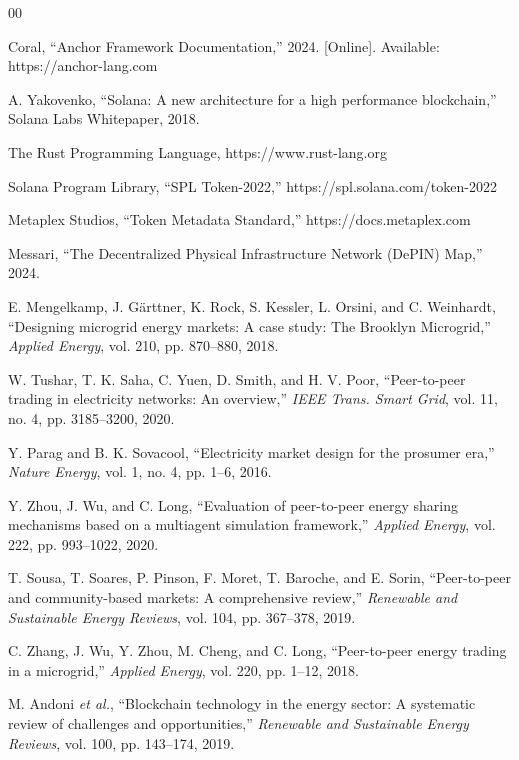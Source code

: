 \documentclass[conference]{IEEEtran}
\begin{document}
\begin{thebibliography}{00}

 Coral, ``Anchor Framework Documentation,'' 2024. [Online]. Available: https://anchor-lang.com

 A. Yakovenko, ``Solana: A new architecture for a high performance blockchain,'' Solana Labs Whitepaper, 2018.

 The Rust Programming Language, https://www.rust-lang.org

 Solana Program Library, ``SPL Token-2022,'' https://spl.solana.com/token-2022

 Metaplex Studios, ``Token Metadata Standard,'' https://docs.metaplex.com

 Messari, ``The Decentralized Physical Infrastructure Network (DePIN) Map,'' 2024.

 E. Mengelkamp, J. G\"arttner, K. Rock, S. Kessler, L. Orsini, and C. Weinhardt, ``Designing microgrid energy markets: A case study: The Brooklyn Microgrid,'' \textit{Applied Energy}, vol. 210, pp. 870--880, 2018.

 W. Tushar, T. K. Saha, C. Yuen, D. Smith, and H. V. Poor, ``Peer-to-peer trading in electricity networks: An overview,'' \textit{IEEE Trans. Smart Grid}, vol. 11, no. 4, pp. 3185--3200, 2020.

 Y. Parag and B. K. Sovacool, ``Electricity market design for the prosumer era,'' \textit{Nature Energy}, vol. 1, no. 4, pp. 1--6, 2016.

 Y. Zhou, J. Wu, and C. Long, ``Evaluation of peer-to-peer energy sharing mechanisms based on a multiagent simulation framework,'' \textit{Applied Energy}, vol. 222, pp. 993--1022, 2020.

 T. Sousa, T. Soares, P. Pinson, F. Moret, T. Baroche, and E. Sorin, ``Peer-to-peer and community-based markets: A comprehensive review,'' \textit{Renewable and Sustainable Energy Reviews}, vol. 104, pp. 367--378, 2019.

 C. Zhang, J. Wu, Y. Zhou, M. Cheng, and C. Long, ``Peer-to-peer energy trading in a microgrid,'' \textit{Applied Energy}, vol. 220, pp. 1--12, 2018.

 M. Andoni \textit{et al.}, ``Blockchain technology in the energy sector: A systematic review of challenges and opportunities,'' \textit{Renewable and Sustainable Energy Reviews}, vol. 100, pp. 143--174, 2019.


\end{thebibliography}
\end{document}
